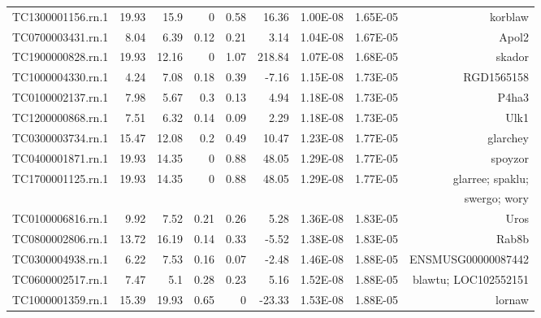 \begin{sidewaystable}[]
\begin{tabular}{lrrrrrrrr}
TC1300001156.rn.1 & 19.93          & 15.9           & 0      & 0.58   & 16.36       & 1.00E-08 & 1.65E-05  & korblaw                       \\
TC0700003431.rn.1 & 8.04           & 6.39           & 0.12   & 0.21   & 3.14        & 1.04E-08 & 1.67E-05  & Apol2                         \\
TC1900000828.rn.1 & 19.93          & 12.16          & 0      & 1.07   & 218.84      & 1.07E-08 & 1.68E-05  & skador                        \\
TC1000004330.rn.1 & 4.24           & 7.08           & 0.18   & 0.39   & -7.16       & 1.15E-08 & 1.73E-05  & RGD1565158                    \\
TC0100002137.rn.1 & 7.98           & 5.67           & 0.3    & 0.13   & 4.94        & 1.18E-08 & 1.73E-05  & P4ha3                         \\
TC1200000868.rn.1 & 7.51           & 6.32           & 0.14   & 0.09   & 2.29        & 1.18E-08 & 1.73E-05  & Ulk1                          \\
TC0300003734.rn.1 & 15.47          & 12.08          & 0.2    & 0.49   & 10.47       & 1.23E-08 & 1.77E-05  & glarchey                      \\
TC0400001871.rn.1 & 19.93          & 14.35          & 0      & 0.88   & 48.05       & 1.29E-08 & 1.77E-05  & spoyzor                       \\
TC1700001125.rn.1 & 19.93          & 14.35          & 0      & 0.88   & 48.05       & 1.29E-08 & 1.77E-05  & glarree; spaklu;              \\
                  &                 &               &       &         &             &           &           &swergo; wory \\
TC0100006816.rn.1 & 9.92           & 7.52           & 0.21   & 0.26   & 5.28        & 1.36E-08 & 1.83E-05  & Uros                          \\
TC0800002806.rn.1 & 13.72          & 16.19          & 0.14   & 0.33   & -5.52       & 1.38E-08 & 1.83E-05  & Rab8b                         \\
TC0300004938.rn.1 & 6.22           & 7.53           & 0.16   & 0.07   & -2.48       & 1.46E-08 & 1.88E-05  & ENSMUSG00000087442            \\
TC0600002517.rn.1 & 7.47           & 5.1            & 0.28   & 0.23   & 5.16        & 1.52E-08 & 1.88E-05  & blawtu; LOC102552151          \\
TC1000001359.rn.1 & 15.39          & 19.93          & 0.65   & 0      & -23.33      & 1.53E-08 & 1.88E-05  & lornaw                        \\

\end{tabular}
\end{sidewaystable}
